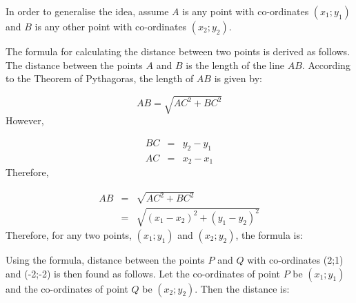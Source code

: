         \label{m39107*id67126}In order to generalise the idea, assume $A$ is any point with co-ordinates $({x}_{1};{y}_{1})$ and $B$ is any other point with co-ordinates $({x}_{2};{y}_{2})$.\par 
    \setcounter{subfigure}{0}
 	\begin{figure}[H] %
    \begin{center}
    \end{center}
 \end{figure}       
        \label{m39107*id67214}The formula for calculating the distance between two points is derived as follows. The distance between the points $A$ and $B$ is the length of the line $AB$. According to the Theorem of Pythagoras, the length of $AB$ is given by:\par 
        \label{m39107*id67261}\nopagebreak\noindent{}
          
    \begin{equation*}
    AB=\sqrt{A{C}^{2}+B{C}^{2}}
      \end{equation*}
        \label{m39107*id67300}However,\par 
        \label{m39107*id67306}\nopagebreak\noindent{}
          
    \begin{eqnarray*}
     BC & = & {y}_{2}-{y}_{1} \\ AC & = & {x}_{2}-{x}_{1}
      \end{eqnarray*}
        \label{m39107*id67375}Therefore,\par 
        \label{m39107*id67379}\nopagebreak\noindent{}
          
    \begin{eqnarray*} 
AB & = & \sqrt{A{C}^{2}+B{C}^{2}} \\ 
& =& \sqrt{{({x}_{1}-{x}_{2})}^{2}+{({y}_{1}-{y}_{2})}^{2}} 
\end{eqnarray*}
        \label{m39107*id67499}Therefore, for any two points, $\left({x}_{1};{y}_{1}\right)$ and $\left({x}_{2};{y}_{2}\right)$, the formula is:\par 
        \label{m39107*id67630}Using the formula, distance between the points $P$ and $Q$ with co-ordinates (2;1) and (-2;-2) is then found as follows. Let the co-ordinates of point $P$ be $\left({x}_{1};{y}_{1}\right)$ and the co-ordinates of point $Q$ be $\left({x}_{2};{y}_{2}\right)$. Then the distance is:\par 
        \label{m39107*id67728}\nopagebreak\noindent{}
          
